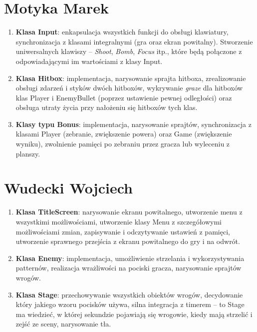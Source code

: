 \documentclass[a4paper,twoside]{article}
\begin{document}
		\section{Motyka Marek}
			\begin{enumerate}[label=\alph*.]
				\item \textbf{Klasa Input}: enkapsulacja wszystkich funkcji do obsługi klawiatury, synchronizacja z klasami integralnymi (gra oraz ekran powitalny). Stworzenie uniwersalnych klawiszy – \emph{Shoot}, \emph{Bomb}, \emph{Focus} itp., które będą połączone z odpowiadającymi im wartościami z klasy Input.
				\item \textbf{Klasa Hitbox}: implementacja, narysowanie sprajta hitboxa, zrealizowanie obsługi zdarzeń i styków dwóch hitboxów, wykrywanie \textit{graze} dla hitboxów klas Player i EnemyBullet (poprzez ustawienie pewnej odległości) oraz obsługa utraty życia przy nałożeniu się hitboxów tych klas.
				\item \textbf{Klasy typu Bonus}: implementacja, narysowanie sprajtów, synchronizacja z klasami Player (zebranie, zwiększenie powera) oraz Game (zwiększenie wyniku), zwolnienie pamięci po zebraniu przez gracza lub wyleceniu z planszy.
			\end{enumerate}
	
		\section{Wudecki Wojciech}
			\begin{enumerate}[label=\alph*.]
				\item \textbf{Klasa TitleScreen}: narysowanie ekranu powitalnego, utworzenie menu z wszystkimi możliwościami, utworzenie klasy Menu z szczegółowymi możliwościami zmian, zapisywanie i odczytywanie ustawień z pamięci, utworzenie sprawnego przejścia z ekranu powitalnego do gry i na odwrót.
				\item \textbf{Klasa Enemy}: implementacja, umożliwienie strzelania i wykorzystywania patternów, realizacja wrażliwości na pociski gracza, narysowanie sprajtów wrogów.
				\item \textbf{Klasa Stage}: przechowywanie wszystkich obiektów wrogów, decydowanie który jakiego wzoru pocisków używa, silna integracja z timerem – to Stage ma wiedzieć, w której sekundzie pojawiają się wrogowie, kiedy mają strzelić i zejść ze sceny, narysowanie tła.
				
			\end{enumerate}
		
		
		
\end{document}
